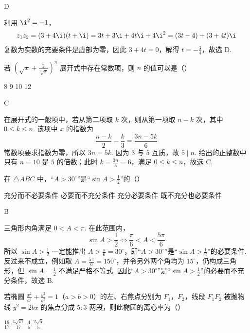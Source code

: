 \begin{answer}
D
\end{answer}

\begin{solution}
利用 \(\i^2=-1\)，
\[
z_1z_2=(3+4\i)(t+\i)=3t+3\i+4t\i+4\i^2=(3t-4)+(3+4t)\i
\]
复数为实数的充要条件是虚部为零，因此 \(3+4t=0\)，解得
\(t=-\frac34\)，故选 D.
\end{solution}

\begin{problem}
若 \(\left(\sqrt{x}+\frac{2}{\sqrt[3]{x}}\right)^n\) 展开式中存在常数项，则 \(n\) 的值可以是（\quad）

\choices
    {8}
    {9}
    {10}
    {12}
\end{problem}

\begin{answer}
C
\end{answer}

\begin{solution}
在展开式的一般项中，若从第二项取 \(k\) 次，则从第一项取 \(n-k\) 次，其中 \(0\leqslant k\leqslant n\). 该项中 \(x\) 的指数为
\[
\frac{n-k}{2}-\frac{k}{3}=\frac{3n-5k}{6}
\]
常数项要求指数为零，所以 \(3n=5k\). 因为 \(3\) 与 \(5\) 互质，故 \(5\mid n\). 给出的正整数中只有 \(n=10\) 是 \(5\) 的倍数；此时 \(k=\frac{3n}{5}=6\)，满足 \(0\leqslant k\leqslant n\)，故选 C.
\end{solution}

\begin{problem}
在 \(\triangle ABC\) 中，“\(A>30^{\circ}\)”是“\(\sin A>\frac{1}{2}\)”的（\quad）

\choices
    {充分而不必要条件}
    {必要而不充分条件}
    {充分必要条件}
    {既不充分也必要条件}
\end{problem}

\begin{answer}
B
\end{answer}

\begin{solution}
三角形内角满足 \(0<A<\pi\). 在此范围内，
\[
\sin A>\frac12\iff \frac{\pi}{6}<A<\frac{5\pi}{6}
\]
所以 \(\sin A>\frac12\) 一定能推出 \(A>\frac{\pi}{6}=30^{\circ}\)，即“\(A>30^{\circ}\)”是“\(\sin A>\frac12\)”的必要条件. 反过来不成立，例如取 \(A=\frac{5\pi}{6}=150^{\circ}\)，并令另外两个角均为 \(15^{\circ}\)，仍构成三角形，但 \(\sin A=\frac12\) 不满足严格不等式. 因此“\(A>30^{\circ}\)”是“\(\sin A>\frac12\)”的必要而不充分条件，故选 B.
\end{solution}

\begin{problem}
若椭圆 \(\frac{x^2}{a^2}+\frac{y^2}{b^2}=1\)（\(a>b>0\)）的左、右焦点分别为 \(F_1\)，\(F_2\)，线段 \(F_1F_2\) 被抛物线 \(y^2=2bx\) 的焦点分成 \(5:3\) 两段，则此椭圆的离心率为（\quad）

\choices
    {\(\frac{16}{17}\)}
    {\(\frac{4\sqrt{17}}{17}\)}
    {\(\frac{4}{5}\)}
    {\(\frac{2\sqrt{5}}{5}\)}
\end{problem}

